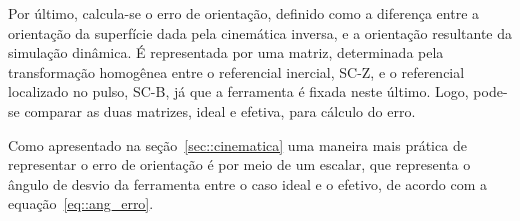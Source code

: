 
Por último, calcula-se o erro de orientação, definido como a diferença entre a
orientação da superfície dada pela cinemática inversa, e a orientação resultante
da simulação dinâmica. 
É representada por uma matriz, determinada pela transformação homogênea entre o
referencial inercial, SC-Z, e o referencial localizado no pulso, SC-B, já que a
ferramenta é fixada neste último. Logo, pode-se comparar as duas matrizes, ideal
e efetiva, para cálculo do erro.

Como apresentado na seção~\ref{sec::cinematica} uma maneira mais prática de
representar o erro de orientação é por meio de um escalar, que representa o
ângulo de desvio da ferramenta entre o caso ideal e o efetivo, de acordo com a
equação~\ref{eq::ang_erro}.


